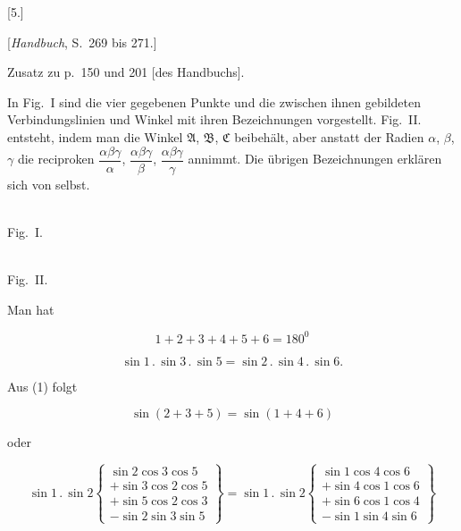 
\begin{center}
[5.]

[\emph{Handbuch}, S.\ 269 bis 271.]
\end{center}

\begin{center}Zusatz zu p.\ 150 und 201 [des Handbuchs].\end{center}

In Fig.\ I sind die vier gegebenen Punkte und die zwischen ihnen gebildeten Verbindungslinien und Winkel mit ihren Bezeichnungen vorgestellt. Fig.\ II. entsteht, indem man die Winkel $\mathfrak{A}$, $\mathfrak{B}$, $\mathfrak{C}$ beibehält, aber anstatt der Radien $\alpha$, $\beta$, $\gamma$ die reciproken $\dfrac{\alpha\beta\gamma}{\alpha}$, $\dfrac{\alpha\beta\gamma}{\beta}$, $\dfrac{\alpha\beta\gamma}{\gamma}$ annimmt. Die übrigen Bezeichnungen erklären sich von selbst.

\begin{center}
\begin{minipage}[b]{5.5cm}\centering\\Fig.\ I.\end{minipage}\hspace{.3cm}%
\begin{minipage}[b]{6.6cm}\centering\\Fig.\ II.\end{minipage}
\end{center}

Man hat

\begin{equation}
1+2+3+4+5+6=180^0
\tag{1}
\end{equation}

\begin{equation}
\sin 1 \, . \, \sin 3 \, . \, \sin 5 = \sin 2 \, . \, \sin 4 \, . \, \sin 6.
\tag{2}
\end{equation}

Aus (1) folgt

\[
\sin(2+3+5) = \sin(1+4+6)
\]

oder

\[
\sin 1 \, . \, \sin 2 \left\{\begin{array}{l} \sin 2 \cos 3 \cos 5 \\ + \sin 3 \cos 2 \cos 5 \\ + \sin 5 \cos 2 \cos 3 \\ - \sin 2 \sin 3 \sin 5 \end{array}\right\}
= \sin 1 \, . \, \sin 2 \left\{\begin{array}{l} \sin 1 \cos 4 \cos 6 \\ + \sin 4 \cos 1 \cos 6 \\ + \sin 6 \cos 1 \cos 4 \\ - \sin 1 \sin 4 \sin 6 \end{array}\right\}
\]

